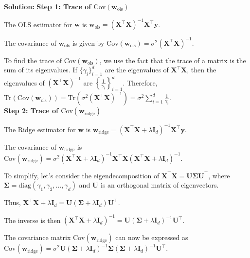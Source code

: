 \documentclass{article}
\newenvironment{solution}{\color{blue} \smallskip \textbf{Solution:}}{}
\begin{document}
\begin{enumerate}[(a)]
\begin{solution}
\textbf{Step 1: Trace of \(\text{Cov}(\mathbf{w}_{\text{ols}})\)}

The OLS estimator for \(\mathbf{w}\) is \(\mathbf{w}_{\text{ols}} = (\mathbf{X}^\top \mathbf{X})^{-1} \mathbf{X}^\top \mathbf{y}\).

The covariance of \(\mathbf{w}_{\text{ols}}\) is given by \(\text{Cov}(\mathbf{w}_{\text{ols}}) = \sigma^2 (\mathbf{X}^\top \mathbf{X})^{-1}\).

To find the trace of \(\text{Cov}(\mathbf{w}_{\text{ols}})\), we use the fact that the trace of a matrix is the sum of its eigenvalues. If \(\{\gamma_i\}_{i=1}^d\) are the eigenvalues of \(\mathbf{X}^\top \mathbf{X}\), then the eigenvalues of \((\mathbf{X}^\top \mathbf{X})^{-1}\) are \(\left\{\frac{1}{\gamma_i}\right\}_{i=1}^d\). Therefore, \(\text{Tr}(\text{Cov}(\mathbf{w}_{\text{ols}})) = \text{Tr} \left( \sigma^2 (\mathbf{X}^\top \mathbf{X})^{-1} \right) = \sigma^2 \sum_{i=1}^d \frac{1}{\gamma_i}\).\\

\textbf{Step 2: Trace of \(\text{Cov}(\mathbf{w}_{\text{ridge}})\)}

The Ridge estimator for \(\mathbf{w}\) is \(\mathbf{w}_{\text{ridge}} = (\mathbf{X}^\top \mathbf{X} + \lambda \mathbf{I}_d)^{-1} \mathbf{X}^\top \mathbf{y}\).

The covariance of \(\mathbf{w}_{\text{ridge}}\) is \(\text{Cov}(\mathbf{w}_{\text{ridge}}) = \sigma^2 (\mathbf{X}^\top \mathbf{X} + \lambda \mathbf{I}_d)^{-1} \mathbf{X}^\top \mathbf{X} (\mathbf{X}^\top \mathbf{X} + \lambda \mathbf{I}_d)^{-1}\).

To simplify, let’s consider the eigendecomposition of \(\mathbf{X}^\top \mathbf{X} = \mathbf{U} \boldsymbol{\Sigma} \mathbf{U}^\top\), where \(\boldsymbol{\Sigma} = \text{diag}(\gamma_1, \gamma_2, \dots, \gamma_d)\) and \(\mathbf{U}\) is an orthogonal matrix of eigenvectors.

Thus, \(\mathbf{X}^\top \mathbf{X} + \lambda \mathbf{I}_d = \mathbf{U} (\boldsymbol{\Sigma} + \lambda \mathbf{I}_d) \mathbf{U}^\top\).

The inverse is then \((\mathbf{X}^\top \mathbf{X} + \lambda \mathbf{I}_d)^{-1} = \mathbf{U} (\boldsymbol{\Sigma} + \lambda \mathbf{I}_d)^{-1} \mathbf{U}^\top\).

The covariance matrix \(\text{Cov}(\mathbf{w}_{\text{ridge}})\) can now be expressed as \(\text{Cov}(\mathbf{w}_{\text{ridge}}) = \sigma^2 \mathbf{U} (\boldsymbol{\Sigma} + \lambda \mathbf{I}_d)^{-1} \boldsymbol{\Sigma} (\boldsymbol{\Sigma} + \lambda \mathbf{I}_d)^{-1} \mathbf{U}^\top\).


\end{solution}
\end{enumerate}
\end{document}
